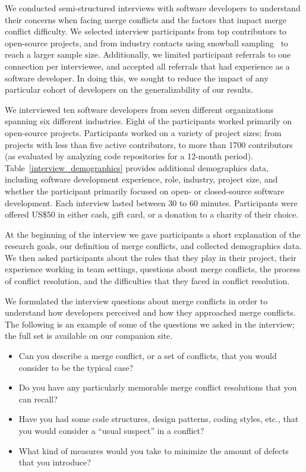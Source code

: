 We conducted semi-structured interviews with software developers to understand their concerns when facing merge conflicts and the factors that impact merge conflict difficulty.
We selected interview participants from top contributors to open-source projects, and from industry contacts using snowball sampling~\cite{goodman1961snowball} to reach a larger sample size. 
Additionally, we limited participant referrals to one connection per interviewee, and accepted all referrals that had experience as a software developer. In doing this, we sought to reduce the impact of any particular cohort of developers on the generalizability  of our results.

We interviewed ten software developers from seven different organizations spanning six different industries.
Eight of the participants worked primarily on open-source projects.
Participants worked on a variety of project sizes; from projects with less than five active contributors, to more than 1700 contributors (as evaluated by analyzing code repositories for a 12-month period).
Table~\ref{interview_demographics} provides additional demographics data, including software development experience, role, industry, project size, and whether the participant primarily focused on open- or closed-source software development.
Each interview lasted between 30 to 60 minutes.
Participants were offered US\$50 in either cash, gift card, or a donation to a charity of their choice.

At the beginning of the interview we gave participants a short explanation of the research goals, our definition of merge conflicts, and collected demographics data. 
We then asked participants about the roles that they play in their project, their experience working in team settings, questions about merge conflicts, the process of conflict resolution, and the difficulties that they faced in conflict resolution.

We formulated the interview questions about merge conflicts in order to understand how developers perceived and how they approached merge conflicts.
The following is an example of some of the questions we asked in the interview; the full set is available on our companion site.
\begin{itemize}
	\item Can you describe a merge conflict, or a set of conflicts, that you would consider to be the typical case?
	\item Do you have any particularly memorable merge conflict resolutions that you can recall?
	\item Have you had some code structures, design patterns, coding styles, etc., that you would consider a ``usual suspect'' in a conflict?
	\item What kind of measures would you take to minimize the amount of defects that you introduce?
\end{itemize}

